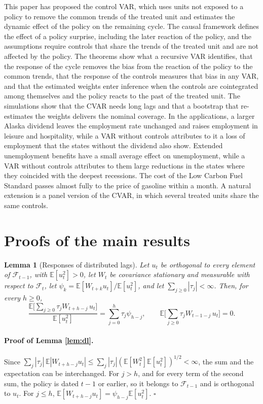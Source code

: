 \documentclass[12pt,a4paper]{article}
\newtheorem{lem}{Lemma}
\theoremstyle{definition}
\theoremstyle{definition}\newtheorem{example}{Example}
\theoremstyle{definition}\newtheorem{definition}{Definition}
\newcommand{\E}{\mathbb{E}}
\begin{document}
This paper has proposed the control VAR, which uses units not exposed to a policy to remove the common trends of the treated unit and estimates the dynamic effect of the policy on the remaining cycle. The causal framework defines the effect of a policy surprise, including the later reaction of the policy, and the assumptions require controls that share the trends of the treated unit and are not affected by the policy. The theorems show what a recursive VAR identifies, that the response of the cycle removes the bias from the reaction of the policy to the common trends, that the response of the controls measures that bias in any VAR, and that the estimated weights enter inference when the controls are cointegrated among themselves and the policy reacts to the past of the treated unit. The simulations show that the CVAR needs long lags and that a bootstrap that re-estimates the weights delivers the nominal coverage. In the applications, a larger Alaska dividend leaves the employment rate unchanged and raises employment in leisure and hospitality, while a VAR without controls attributes to it a loss of employment that the states without the dividend also show. Extended unemployment benefits have a small average effect on unemployment, while a VAR without controls attributes to them large reductions in the states where they coincided with the deepest recessions. The cost of the Low Carbon Fuel Standard passes almost fully to the price of gasoline within a month. A natural extension is a panel version of the CVAR, in which several treated units share the same controls.

\newpage
\appendix
\section{Proofs of the main results\label{sec:proofs-main}}

\begin{lem}[Responses of distributed lags\label{lem:dl}]
Let $u_t$ be orthogonal to every element of $\mathcal F_{t-1}$, with $\E[u_t^2]>0$, let $W_t$ be covariance stationary and measurable with respect to $\mathcal F_t$, let $\psi_k=\E[W_{t+k}u_t]/\E[u_t^2]$, and let $\sum_{j\geq0}|\tau_j|<\infty$. Then, for every $h\geq0$,
\[
\frac{\E\big[\sum_{j\geq0}\tau_jW_{t+h-j}\,u_t\big]}{\E[u_t^2]}=\sum_{j=0}^{h}\tau_j\psi_{h-j},
\qquad
\E\Big[\sum_{j\geq0}\tau_jW_{t-1-j}\,u_t\Big]=0 .
\]
\end{lem}

\paragraph{Proof of Lemma \ref{lem:dl}.} Since $\sum_j|\tau_j|\,\E|W_{t+h-j}u_t|\leq\sum_j|\tau_j|(\E[W_t^2]\E[u_t^2])^{1/2}<\infty$, the sum and the expectation can be interchanged. For $j>h$, and for every term of the second sum, the policy is dated $t-1$ or earlier, so it belongs to $\mathcal F_{t-1}$ and is orthogonal to $u_t$. For $j\leq h$, $\E[W_{t+h-j}u_t]=\psi_{h-j}\E[u_t^2]$. $\square$
\end{document}
